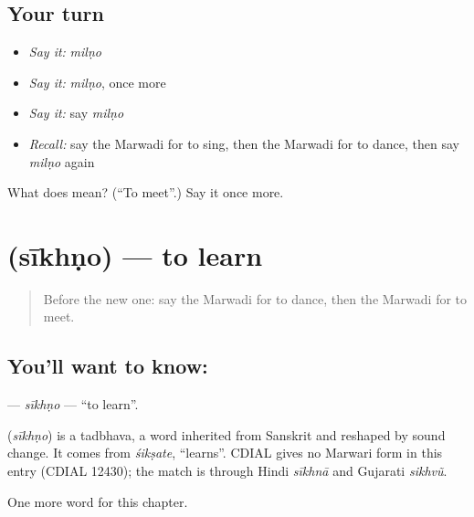 \subsection*{Your turn}
\begin{itemize}
\raggedright
  \item \emph{Say it:} \emph{milṇo}
  \item \emph{Say it:} \emph{milṇo}, once more
  \item \emph{Say it:} say \emph{milṇo}
  \item \emph{Recall:} say the Marwadi for to sing, then the Marwadi for to dance, then say \emph{milṇo} again
\end{itemize}

\begin{tcolorbox}[breakable,colback=teal!4,colframe=teal!35!black,title={Before you move on}]
What does  mean? (\textquotedblleft{}To meet\textquotedblright{}.) Say it once more.
\end{tcolorbox}
\section[\texorpdfstring{\mw{सीखणो} (sīkhṇo)}{सीखणो (sīkhṇo)}]{ (sīkhṇo) — to learn}

\label{lesson:MW-C55-sikhno}



\begin{quote}
Before the new one: say the Marwadi for to dance, then the Marwadi for to meet.
\end{quote}

\subsection*{You'll want to know: }
\textbf{} — \emph{sīkhṇo} — \textquotedblleft{}to learn\textquotedblright{}.

\begin{cousinweb}
\textbf{} (\emph{sīkhṇo}) is a tadbhava, a word inherited from Sanskrit and reshaped by sound change. It comes from \emph{śikṣate}, \textquotedblleft{}learns\textquotedblright{}. CDIAL gives no Marwari form in this entry (CDIAL 12430); the match is through Hindi \emph{sīkhnā} and Gujarati \emph{sikhvũ}.
\end{cousinweb}

\begin{grammarlens}[title={What you've built}]
One more word for this chapter.
\end{grammarlens}

